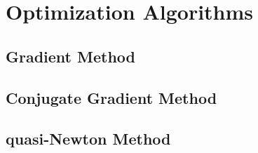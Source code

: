 \section{Optimization Algorithms}

\subsection{Gradient Method}

\subsection{Conjugate Gradient Method}

\subsection{quasi-Newton Method}
